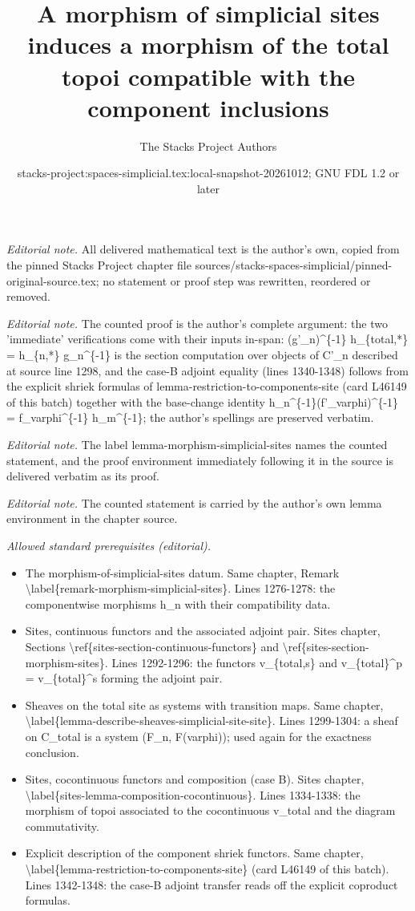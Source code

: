 \documentclass{stacks-project}
\title{A morphism of simplicial sites induces a morphism of the total topoi compatible with the component inclusions}
\author{The Stacks Project Authors}
\date{stacks-project:spaces-simplicial.tex:local-snapshot-20261012; GNU FDL 1.2 or later}
\theoremstyle{plain}
\theoremstyle{definition}
\theoremstyle{remark}
\numberwithin{equation}{subsection}
\begin{document}
\maketitle
\noindent\textit{Editorial note.} All delivered mathematical text is the author's own, copied from the pinned Stacks Project chapter file sources/stacks-spaces-simplicial/pinned-original-source.tex; no statement or proof step was rewritten, reordered or removed.\par\medskip
\noindent\textit{Editorial note.} The counted proof is the author's complete argument: the two 'immediate' verifications come with their inputs in-span: (g'\_n)\textasciicircum{}\{-1\} h\_\{total,*\} = h\_\{n,*\} g\_n\textasciicircum{}\{-1\} is the section computation over objects of C'\_n described at source line 1298, and the case-B adjoint equality (lines 1340-1348) follows from the explicit shriek formulas of lemma-restriction-to-components-site (card L46149 of this batch) together with the base-change identity h\_n\textasciicircum{}\{-1\}(f'\_varphi)\textasciicircum{}\{-1\} = f\_varphi\textasciicircum{}\{-1\} h\_m\textasciicircum{}\{-1\}; the author's spellings are preserved verbatim.\par\medskip
\noindent\textit{Editorial note.} The label lemma-morphism-simplicial-sites names the counted statement, and the proof environment immediately following it in the source is delivered verbatim as its proof.\par\medskip
\noindent\textit{Editorial note.} The counted statement is carried by the author's own lemma environment in the chapter source.\par\medskip
\noindent\textit{Allowed standard prerequisites (editorial).}\begin{itemize}
\item The morphism-of-simplicial-sites datum. Same chapter, Remark \textbackslash{}label\{remark-morphism-simplicial-sites\}. Lines 1276-1278: the componentwise morphisms h\_n with their compatibility data.
\item Sites, continuous functors and the associated adjoint pair. Sites chapter, Sections \textbackslash{}ref\{sites-section-continuous-functors\} and \textbackslash{}ref\{sites-section-morphism-sites\}. Lines 1292-1296: the functors v\_\{total,s\} and v\_\{total\}\textasciicircum{}p = v\_\{total\}\textasciicircum{}s forming the adjoint pair.
\item Sheaves on the total site as systems with transition maps. Same chapter, \textbackslash{}label\{lemma-describe-sheaves-simplicial-site-site\}. Lines 1299-1304: a sheaf on C\_total is a system (F\_n, F(varphi)); used again for the exactness conclusion.
\item Sites, cocontinuous functors and composition (case B). Sites chapter, \textbackslash{}label\{sites-lemma-composition-cocontinuous\}. Lines 1334-1338: the morphism of topoi associated to the cocontinuous v\_total and the diagram commutativity.
\item Explicit description of the component shriek functors. Same chapter, \textbackslash{}label\{lemma-restriction-to-components-site\} (card L46149 of this batch). Lines 1342-1348: the case-B adjoint transfer reads off the explicit coproduct formulas.
\end{itemize}\medskip
\end{document}
